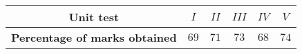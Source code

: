 \normalsize \begin{tabular}{c |c |c |c |c |c }

\textbf{Unit test} & $I$ & $II$ & $III$ & $IV$ & $V$ \\
\hline
\textbf{Percentage of marks obtained} & $69$ & $71$ & $73$ & $68$ & $74$

\end{tabular}
	 